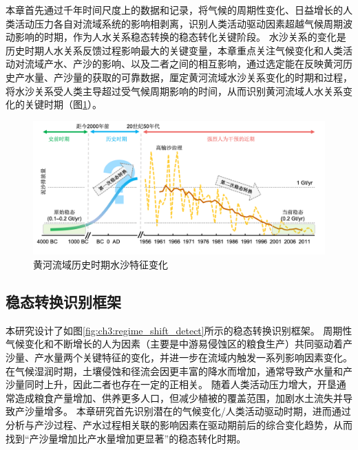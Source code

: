 
本章首先通过千年时间尺度上的数据和记录，将气候的周期性变化、日益增长的人类活动压力各自对流域系统的影响相剥离，识别人类活动驱动因素超越气候周期波动影响的时期，作为人\textendash{}水关系稳态转换的稳态转化关键阶段。
水沙关系的变化是历史时期人\textendash{}水关系反馈过程影响最大的关键变量，本章重点关注气候变化和人类活动对流域产水、产沙的影响、以及二者之间的相互影响，通过选定能在反映黄河历史产水量、产沙量的获取的可靠数据，厘定黄河流域水沙关系变化的时期和过程，将水沙关系受人类主导超过受气候周期影响的时间，从而识别黄河流域人\textendash{}水关系变化的关键时期（图\ref{fig:ch3:why_regime_shift}）。

\begin{figure}[!ht] %
    \centering
    \includegraphics[width=\textwidth]{img/ch3/ch3_why_regime_shift.png}
    \caption{黄河流域历史时期水沙特征变化}\label{fig:ch3:why_regime_shift}
\end{figure}

\subsection{稳态转换识别框架}\label{sec:ch3:approach}

本研究设计了如图\ref{fig:ch3:regime_shift_detect}所示的稳态转换识别框架。
周期性气候变化和不断增长的人为因素（主要是中游易侵蚀区的粮食生产）共同驱动着产沙量、产水量两个关键特征的变化，并进一步在流域内触发一系列影响因素变化\cite{xujiongxin2011}。
在气候湿润时期，土壤侵蚀和径流会因更丰富的降水而增加，通常导致产水量和产沙量同时上升，因此二者也存在一定的正相关\cite{GeQuanSheng2011}。
随着人类活动压力增大，开垦通常造成粮食产量增加、供养更多人口，但减少植被的覆盖范围，加剧水土流失并导致产沙量增多\cite{wu2020a}。
本章研究首先识别潜在的气候变化/人类活动驱动时期，进而通过分析与产沙过程、产水过程相关联的影响因素在驱动期前后的综合变化趋势，从而找到“产沙量增加比产水量增加更显著”的稳态转化时期。

